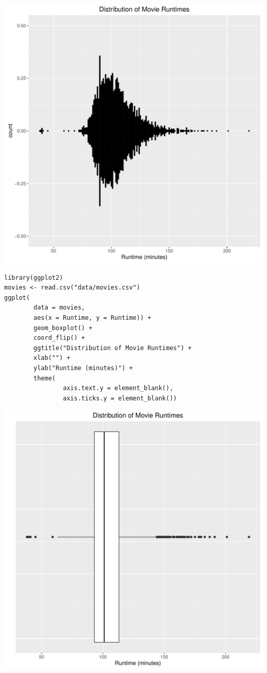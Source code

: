 \documentclass[a4paper, captions=tableheading]{tufte-book}
\begin{document}
\includegraphics[width=.9\linewidth]{img/1-num-ggplot2-01.pdf}


\begin{verbatim}
library(ggplot2)
movies <- read.csv("data/movies.csv")
ggplot(
		data = movies,
		aes(x = Runtime, y = Runtime)) +
		geom_boxplot() +
		coord_flip() +
		ggtitle("Distribution of Movie Runtimes") +
		xlab("") +
		ylab("Runtime (minutes)") +
		theme(
				axis.text.y = element_blank(),
				axis.ticks.y = element_blank())
\end{verbatim}

\includegraphics[width=.9\linewidth]{img/1-num-ggplot2-02.pdf}
\end{document}

